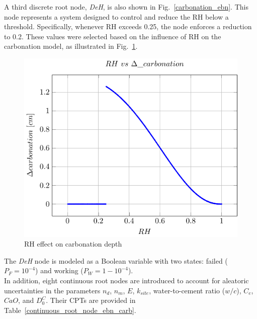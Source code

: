 A third discrete root node, \textit{DeH}, is also shown in Fig.~\ref{carbonation_ebn}. This node represents a system designed to control and reduce the RH below a threshold. Specifically, whenever RH exceeds 0.25, the node enforces a reduction to 0.2. These values were selected based on the influence of RH on the carbonation model, as illustrated in Fig.~\ref{carbonation_depth vs RH}.
\begin{figure}[H]
    \centering
    \includegraphics[width=\linewidth]{imgs/pdfs/10_RH_carb.pdf}
    \caption{RH effect on carbonation depth}\label{carbonation_depth vs RH}
\end{figure}
The \textit{DeH} node is modeled as a Boolean variable with two states: failed ($P_{F} = 10^{-4}$) and working ($P_{W} = 1 - 10^{-4}$). \\
In addition, eight continuous root nodes are introduced to account for aleatoric uncertainties in the parameters $n_d$, $n_m$, $E$, $k_{site}$, water-to-cement ratio ($w/c$), $C_e$, $CaO$, and $D_0^C$. Their CPTs are provided in Table~\ref{continuous_root_node_ebn_carb}.
